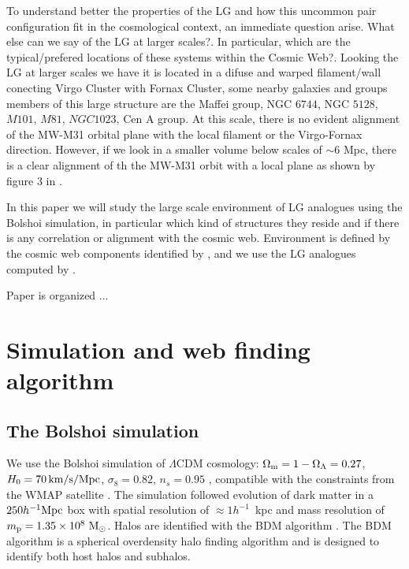 \documentclass{emulateapj}
\newcommand{\mpc}{\rm{Mpc}}
\newcommand{\hmpc}{{\ifmmode{h^{-1}{\rm Mpc}}\else{$h^{-1}$Mpc }\fi}}
\begin{document}
To understand better the properties of the LG and how this uncommon pair configuration fit in the cosmological context, an immediate question arise. What else can we say of the LG at larger scales?. In particular, which are the typical/prefered locations of these systems within the Cosmic Web?.
Looking the LG at larger scales we have it is located in a difuse and warped filament/wall conecting Virgo Cluster with Fornax Cluster, some nearby galaxies and groups members of this large structure are the Maffei group, NGC $6744$, NGC $5128$, $M101$, $M81$, $NGC1023$, Cen A group. At this scale, there is no evident alignment of the MW-M31 orbital plane with the local filament or the Virgo-Fornax direction. 
However, if we look in a smaller volume below scales of $\sim 6$ \mpc, there is a clear alignment of th the MW-M31 orbit with a local plane as shown by figure $3$ in \citet{2013AJ....146...69C}.

In this paper we will study the large scale environment of LG analogues using the Bolshoi simulation, in particular which kind of structures they reside and if there is any correlation or alignment with the cosmic web. 
Environment is defined by the cosmic web components identified by \citet{Tweb}, and we use the LG analogues computed by \citet{lganalogues}.

Paper is organized ...


\section{Simulation and web finding algorithm}
\label{sec:Simulation}

\subsection{The Bolshoi simulation}
We use the Bolshoi simulation of $\Lambda$CDM cosmology: $\Omega_{\rm m}=1-\Omega_{\Lambda}=0.27$, $H_0=70\,\rm km/s/Mpc$, $\sigma_8=0.82$, $n_s=0.95$ \citep{2011ApJ...740..102K}, compatible with the constraints from the WMAP satellite \citep{hinshaw_etal13}. The simulation followed evolution of dark matter in a $250 \hmpc$ box with spatial resolution of $\approx 1h^{-1}$~kpc and mass resolution of $m_{\rm p}=1.35\times 10^8\ \rm M_{\odot}$. Halos are identified with the BDM algorithm  \citep{1997astro.ph.12217K}. The BDM algorithm is  a spherical overdensity halo finding algorithm and is designed to identify both host halos and subhalos.
\end{document}

